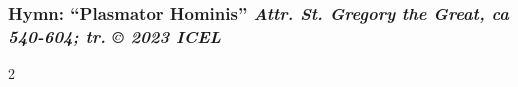 \subsubsection*{Hymn: ``Plasmator Hominis'' \hfill
{\small\itshape Attr. St. Gregory the Great, ca 540-604; tr. © 2023 ICEL}}

\begin{multicols*}{2}
        
\end{multicols*}
